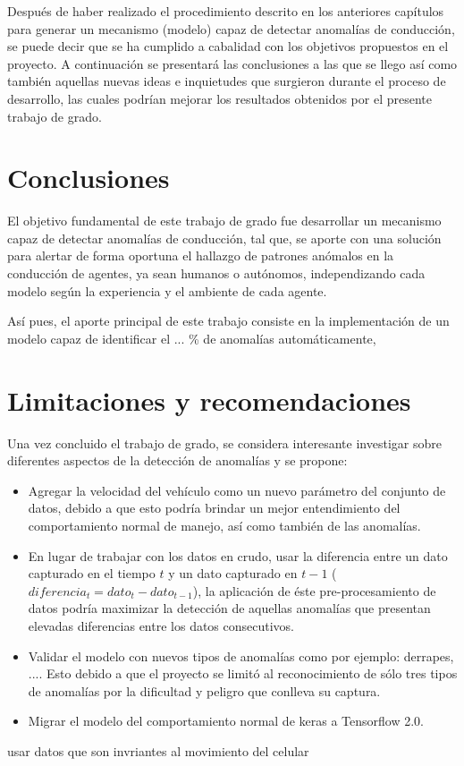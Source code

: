  
Despu\'{e}s de haber realizado el procedimiento descrito en los anteriores cap\'{i}tulos para generar un mecanismo (modelo) capaz de detectar anomal\'{i}as de conducci\'{o}n, se puede decir que se ha cumplido a cabalidad con los objetivos propuestos en el proyecto. A continuaci\'{o}n se presentar\'{a} las conclusiones a las que se llego as\'{i} como tambi\'{e}n aquellas nuevas ideas e inquietudes que surgieron durante el proceso de desarrollo, las cuales podr\'{i}an mejorar los resultados obtenidos por el presente trabajo de grado.

\section{Conclusiones}

El objetivo fundamental de este trabajo de grado fue desarrollar un mecanismo capaz de detectar anomal\'{i}as de conducci\'{o}n, tal que, se aporte con una soluci\'{o}n para alertar de forma oportuna el hallazgo de patrones an\'{o}malos en la conducci\'{o}n de agentes, ya sean humanos o aut\'{o}nomos, independizando cada modelo seg\'{u}n la experiencia y el ambiente de cada agente.

\vspace{5mm} %

As\'{i} pues, el aporte principal de este trabajo consiste en la implementaci\'{o}n de un modelo capaz de identificar el ... \% de anomal\'{i}as autom\'{a}ticamente, 


\section{Limitaciones y recomendaciones}

Una vez concluido el trabajo de grado, se considera interesante investigar sobre diferentes aspectos de la detecci\'{o}n de anomal\'{i}as y se propone:

\begin{itemize}
\item Agregar la velocidad del veh\'{i}culo como un nuevo par\'{a}metro del conjunto de datos, debido a que esto podr\'{i}a brindar un mejor entendimiento del comportamiento normal de manejo, as\'{i} como tambi\'{e}n de las anomal\'{i}as.
\item En lugar de trabajar con los datos en crudo, usar la diferencia entre un dato capturado en el tiempo $t$ y un dato capturado en $t-1$ ($diferencia_{t} = dato_{t}-dato_{t-1}$), la aplicaci\'{o}n de \'{e}ste pre-procesamiento de datos podr\'{i}a maximizar la detecci\'{o}n de aquellas anomal\'{i}as que presentan elevadas diferencias entre los datos consecutivos.
\item Validar el modelo con nuevos tipos de anomal\'{i}as como por ejemplo: derrapes, .... Esto debido a que el proyecto se limit\'{o} al reconocimiento de s\'{o}lo tres tipos de anomal\'{i}as por la dificultad y peligro que conlleva su captura.

\item Migrar el modelo del comportamiento normal de keras a Tensorflow 2.0.
\end{itemize}

usar datos que son invriantes al movimiento del celular


